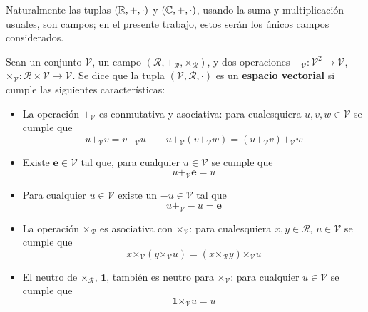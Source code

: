 Naturalmente las tuplas $(\mathbb{R},+,\cdot)$ y $(\mathbb{C},+,\cdot)$, usando la suma y multiplicación usuales, son campos; en el presente trabajo, estos serán los únicos campos considerados.

\begin{definicion}
Sean un conjunto $\mathcal{V}$, un campo $(\mathcal{R},\boldsymbol{+}_\mathcal{R},\boldsymbol{\times}_\mathcal{R})$, y dos operaciones $\boldsymbol{+}_\mathcal{V} : \mathcal{V}^{2} \rightarrow \mathcal{V}$, $\boldsymbol{\times}_\mathcal{V} : \mathcal{R}\times\mathcal{V} \rightarrow \mathcal{V}$. Se dice que la tupla $(\mathcal{V},\mathcal{R},\mathcal{\cdot})$ es un \textbf{espacio vectorial} si cumple las siguientes características:
\begin{itemize}
\item La operación $\boldsymbol{+}_\mathcal{V}$ es conmutativa y asociativa: para cualesquiera $u, v, w \in \mathcal{V}$ se cumple que
\begin{equation*}
u +_\mathcal{V} v = v +_\mathcal{V} u \qquad u +_\mathcal{V} (v +_\mathcal{V} w) = (u +_\mathcal{V} v) +_\mathcal{V} w
\end{equation*}
\item Existe $\boldsymbol{e} \in \mathcal{V}$ tal que, para cualquier $u \in \mathcal{V}$ se cumple que
\begin{equation*}
 u +_\mathcal{V} \boldsymbol{e} = u
\end{equation*}
\item Para cualquier $u \in \mathcal{V}$ existe un $-u \in \mathcal{V}$ tal que
\begin{equation*}
 u +_\mathcal{V} -u =  \boldsymbol{e}
\end{equation*}
\item La operación $\boldsymbol{\times}_\mathcal{R}$ es asociativa con $\boldsymbol{\times}_\mathcal{V}$: para cualesquiera $x, y \in \mathcal{R}$, $u \in \mathcal{V}$ se cumple que
\begin{equation*}
x \boldsymbol{\times}_\mathcal{V} (y \boldsymbol{\times}_\mathcal{V} u ) = (x \boldsymbol{\times}_\mathcal{R} y) \boldsymbol{\times}_\mathcal{V} u
\end{equation*}
\item El neutro de $\boldsymbol{\times}_\mathcal{R}$, $\boldsymbol{1}$, también es neutro para $\boldsymbol{\times}_\mathcal{V}$: para cualquier $u \in \mathcal{V}$ se cumple que
\begin{equation*}
\boldsymbol{1} \boldsymbol{\times}_\mathcal{V} u = u
\end{equation*}

\end{itemize}
\end{definicion}
